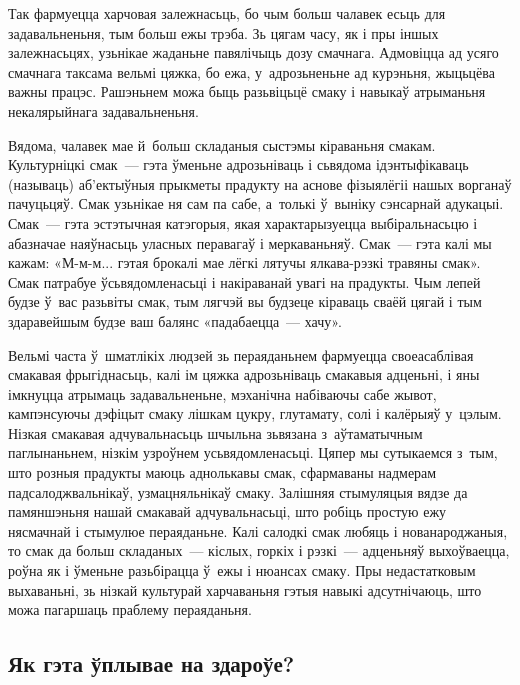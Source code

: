 
Так фармуецца харчовая залежнасьць, бо чым больш чалавек есьць для задавальненьня, тым больш ежы трэба. Зь цягам часу, як і пры іншых залежнасьцях, узьнікае жаданьне павялічыць дозу смачнага. Адмовіцца ад усяго смачнага таксама вельмі цяжка, бо ежа, у~адрозьненьне ад курэньня, жыцьцёва важны працэс. Рашэньнем можа быць разьвіцьцё смаку і навыкаў атрыманьня некалярыйнага задавальненьня.

Вядома, чалавек мае й~больш складаныя сыстэмы кіраваньня смакам. Культурніцкі смак~--- гэта ўменьне адрозьніваць і сьвядома ідэнтыфікаваць (называць) аб'ектыўныя прыкметы прадукту на аснове фізыялёгіі нашых ворганаў пачуцьцяў. Смак узьнікае ня сам па сабе, а~толькі ў~выніку сэнсарнай адукацыі. Смак~--- гэта эстэтычная катэгорыя, якая характарызуецца выбіральнасьцю і абазначае наяўнасьць уласных перавагаў і меркаваньняў. Смак~--- гэта калі мы кажам: «М-м-м... гэтая брокалі мае лёгкі лятучы ялкава-рэзкі травяны смак». Смак патрабуе ўсьвядомленасьці і накіраванай увагі на прадукты. Чым лепей будзе ў~вас разьвіты смак, тым лягчэй вы будзеце кіраваць сваёй цягай і тым здаравейшым будзе ваш балянс «падабаецца~--- хачу».

Вельмі часта ў~шматлікіх людзей зь пераяданьнем фармуецца своеасаблівая смакавая фрыгіднасьць, калі ім цяжка адрозьніваць смакавыя адценьні, і яны імкнуцца атрымаць задавальненьне, мэханічна набіваючы сабе жывот, кампэнсуючы дэфіцыт смаку лішкам цукру, глутамату, солі і калёрыяў у~цэлым. Нізкая смакавая адчувальнасьць шчыльна зьвязана з~аўтаматычным паглынаньнем, нізкім узроўнем усьвядомленасьці. Цяпер мы сутыкаемся з~тым, што розныя прадукты маюць аднолькавы смак, сфармаваны надмерам падсалоджвальнікаў, узмацняльнікаў смаку. Залішняя стымуляцыя вядзе да памяншэньня нашай смакавай адчувальнасьці, што робіць простую ежу нясмачнай і стымулюе пераяданьне. Калі салодкі смак любяць і нованароджаныя, то смак да больш складаных~--- кіслых, горкіх і рэзкі~--- адценьняў выхоўваецца, роўна як і ўменьне разьбірацца ў~ежы і нюансах смаку. Пры недастатковым выхаваньні, зь нізкай культурай харчаваньня гэтыя навыкі адсутнічаюць, што можа пагаршаць праблему пераяданьня.

\subsection{Як гэта ўплывае на здароўе?}

